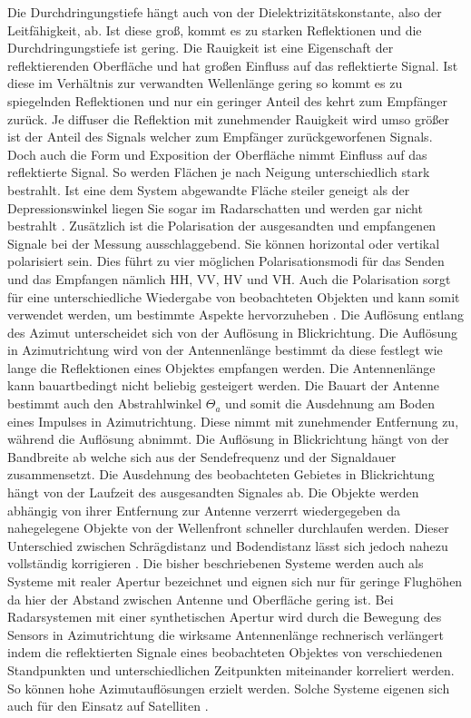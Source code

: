 Die Durchdringungstiefe hängt auch von der Dielektrizitätskonstante, also der Leitfähigkeit, ab. Ist diese groß, kommt es zu starken Reflektionen und die Durchdringungstiefe ist gering. 
Die Rauigkeit ist eine Eigenschaft der reflektierenden Oberfläche und hat großen Einfluss auf das reflektierte Signal. Ist diese im Verhältnis
zur verwandten Wellenlänge gering so kommt es zu spiegelnden Reflektionen und nur ein geringer Anteil des kehrt zum Empfänger zurück. Je diffuser
die Reflektion mit zunehmender Rauigkeit wird umso größer ist der Anteil des Signals welcher zum Empfänger zurückgeworfenen Signals. 
Doch auch die Form und Exposition der Oberfläche nimmt Einfluss auf das reflektierte Signal. So werden Flächen je nach Neigung unterschiedlich stark bestrahlt. 
Ist eine dem System abgewandte Fläche steiler geneigt als der Depressionswinkel liegen Sie sogar im Radarschatten und werden gar nicht bestrahlt \cite{einfuehrung_in_fernerkundung}. 
Zusätzlich ist die Polarisation der ausgesandten und empfangenen Signale bei der Messung ausschlaggebend. Sie können horizontal oder 
vertikal polarisiert sein. Dies führt zu vier möglichen Polarisationsmodi für das Senden und das Empfangen nämlich HH, VV, HV und VH. Auch die 
Polarisation sorgt für eine unterschiedliche Wiedergabe von beobachteten Objekten und kann somit verwendet werden, um bestimmte Aspekte hervorzuheben
 \cite{einfuehrung_in_fernerkundung}. 
Die Auflösung entlang des Azimut unterscheidet sich von der Auflösung in Blickrichtung. Die Auflösung in Azimutrichtung wird von 
der Antennenlänge bestimmt da diese festlegt wie lange die Reflektionen eines Objektes empfangen werden. Die Antennenlänge kann bauartbedingt nicht beliebig gesteigert werden.
Die Bauart der Antenne bestimmt auch den Abstrahlwinkel $\Theta_a$ und somit die Ausdehnung am Boden eines Impulses in Azimutrichtung. Diese nimmt mit zunehmender Entfernung
zu, während die Auflösung abnimmt.
Die Auflösung in Blickrichtung hängt von der Bandbreite ab welche sich aus der Sendefrequenz und der Signaldauer zusammensetzt. Die Ausdehnung des beobachteten Gebietes 
in Blickrichtung hängt von der Laufzeit des ausgesandten Signales ab. Die Objekte werden abhängig von ihrer Entfernung zur Antenne verzerrt wiedergegeben da nahegelegene 
Objekte von der Wellenfront schneller durchlaufen werden. Dieser Unterschied zwischen Schrägdistanz und Bodendistanz lässt sich jedoch nahezu vollständig korrigieren 
\cite{einfuehrung_in_fernerkundung}. 
Die bisher beschriebenen Systeme werden auch als Systeme mit realer Apertur bezeichnet und eignen sich nur für geringe Flughöhen da hier 
der Abstand zwischen Antenne und Oberfläche gering ist. Bei Radarsystemen mit einer synthetischen Apertur wird durch die Bewegung des Sensors in Azimutrichtung die 
wirksame Antennenlänge rechnerisch verlängert indem die reflektierten Signale eines beobachteten Objektes von verschiedenen Standpunkten und unterschiedlichen Zeitpunkten 
miteinander korreliert werden. So können hohe Azimutauflösungen erzielt werden. Solche Systeme eigenen sich auch für den Einsatz auf Satelliten \cite{einfuehrung_in_fernerkundung}. 

